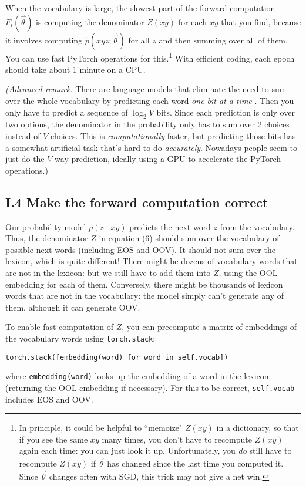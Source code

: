 \documentclass[12pt]{article}
\theoremstyle{plain}
\theoremstyle{definition}
\theoremstyle{remark}
\begin{document}
When the vocabulary is large, the slowest part of the forward computation $F_i(\vec{\theta})$ is computing the denominator $Z(xy)$ for each $xy$ that you find, because it involves computing $\tilde{p}(xyz;\vec{\theta})$ for all $z$ and then summing over all of them. You can use fast PyTorch operations for this.\footnote{In principle, it could be helpful to ``memoize" $Z(xy)$ in a dictionary, so that if you see the same $xy$ many times, you don’t have to recompute $Z(xy)$ again each time: you can just look it up. Unfortunately, you \emph{do} still have to recompute $Z(xy)$ if $\vec{\theta}$ has changed since the last time you computed it. Since $\vec{\theta}$ changes often with SGD, this trick may not give a net win.} With efficient coding, each epoch should take about 1 minute on a CPU.

\textit{(Advanced remark:} There are language models that eliminate the need to sum over the whole vocabulary by predicting each word \textit{one bit at a time} \citep{MnihHinton2009}. Then you only have to predict a sequence of $\log_2 V$ bits. Since each prediction is only over two options, the denominator in the probability only has to sum over 2 choices instead of $V$ choices. This is \textit{computationally} faster, but predicting those bits has a somewhat artificial task that’s hard to do \textit{accurately}. Nowadays people seem to just do the $V$-way prediction, ideally using a GPU to accelerate the PyTorch operations.) 

\subsection*{I.4 Make the forward computation correct}

Our probability model $p(z \mid xy)$ predicts the next word $z$ from the vocabulary. Thus, the denominator $Z$ in equation (6) should sum over the vocabulary of possible next words (including EOS and OOV). It should not sum over the lexicon, which is quite different! There might be dozens of vocabulary words that are not in the lexicon: but we still have to add them into $Z$, using the OOL embedding for each of them. Conversely, there might be thousands of lexicon words that are not in the vocabulary: the model simply can’t generate any of them, although it can generate OOV.

To enable fast computation of $Z$, you can precompute a matrix of embeddings of the vocabulary words using \texttt{torch.stack}:
\begin{verbatim}
torch.stack([embedding(word) for word in self.vocab])
\end{verbatim}
where \texttt{embedding(word)} looks up the embedding of a word in the lexicon (returning the OOL embedding if necessary). For this to be correct, \texttt{self.vocab} includes EOS and OOV.
\end{document}
